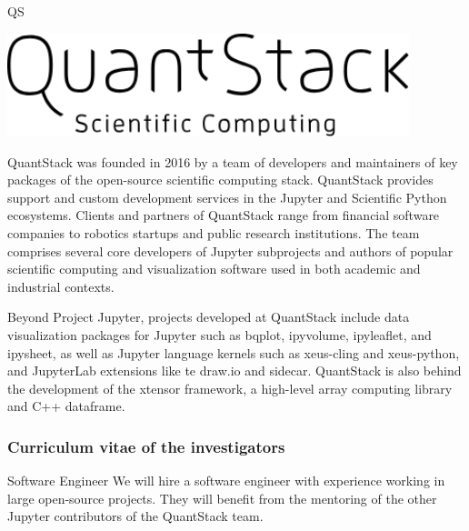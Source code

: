 \begin{sitedescription}{QS}

\begin{center}
\includegraphics[height=3cm]{Participants/Logos/QuantStack.png}
\end{center}

\par QuantStack was founded in 2016 by a team of developers and maintainers of key packages of the open-source scientific computing stack. QuantStack provides support and custom development services in the Jupyter and Scientific Python ecosystems. Clients and partners of QuantStack range from financial software companies to robotics startups and public research institutions. The team comprises several core developers of Jupyter subprojects and authors of popular scientific computing and visualization software used in both academic and industrial contexts.

\par Beyond Project Jupyter, projects developed at QuantStack include data visualization packages for Jupyter such as bqplot, ipyvolume, ipyleaflet, and ipysheet, as well as Jupyter language kernels such as xeus-cling and xeus-python, and JupyterLab extensions like te draw.io and sidecar. QuantStack is also behind the development of the xtensor framework, a high-level array computing library and C++ dataframe.

\subsubsection*{Curriculum vitae of the investigators}






\begin{participant}[type=R,PM=41,salary=7000]{Software Engineer} %
  We will hire a software engineer with experience working in large open-source
  projects. They will benefit from the mentoring of the other Jupyter contributors
  of the QuantStack team.
\end{participant}


\end{sitedescription}
